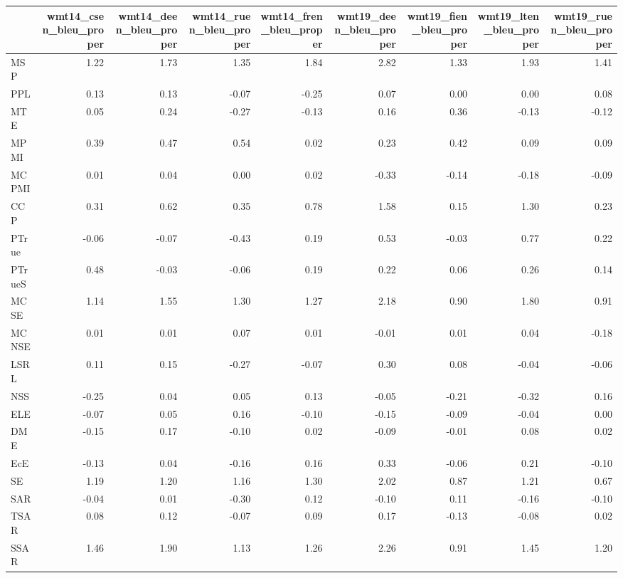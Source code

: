 \begin{tabular}{lrrrrrrrr}
\toprule
 & wmt14\_csen\_bleu\_proper & wmt14\_deen\_bleu\_proper & wmt14\_ruen\_bleu\_proper & wmt14\_fren\_bleu\_proper & wmt19\_deen\_bleu\_proper & wmt19\_fien\_bleu\_proper & wmt19\_lten\_bleu\_proper & wmt19\_ruen\_bleu\_proper \\
\midrule
MSP & 1.22 & 1.73 & 1.35 & 1.84 & 2.82 & 1.33 & 1.93 & 1.41 \\
PPL & 0.13 & 0.13 & -0.07 & -0.25 & 0.07 & 0.00 & 0.00 & 0.08 \\
MTE & 0.05 & 0.24 & -0.27 & -0.13 & 0.16 & 0.36 & -0.13 & -0.12 \\
MPMI & 0.39 & 0.47 & 0.54 & 0.02 & 0.23 & 0.42 & 0.09 & 0.09 \\
MCPMI & 0.01 & 0.04 & 0.00 & 0.02 & -0.33 & -0.14 & -0.18 & -0.09 \\
CCP & 0.31 & 0.62 & 0.35 & 0.78 & 1.58 & 0.15 & 1.30 & 0.23 \\
PTrue & -0.06 & -0.07 & -0.43 & 0.19 & 0.53 & -0.03 & 0.77 & 0.22 \\
PTrueS & 0.48 & -0.03 & -0.06 & 0.19 & 0.22 & 0.06 & 0.26 & 0.14 \\
MCSE & 1.14 & 1.55 & 1.30 & 1.27 & 2.18 & 0.90 & 1.80 & 0.91 \\
MCNSE & 0.01 & 0.01 & 0.07 & 0.01 & -0.01 & 0.01 & 0.04 & -0.18 \\
LSRL & 0.11 & 0.15 & -0.27 & -0.07 & 0.30 & 0.08 & -0.04 & -0.06 \\
NSS & -0.25 & 0.04 & 0.05 & 0.13 & -0.05 & -0.21 & -0.32 & 0.16 \\
ELE & -0.07 & 0.05 & 0.16 & -0.10 & -0.15 & -0.09 & -0.04 & 0.00 \\
DME & -0.15 & 0.17 & -0.10 & 0.02 & -0.09 & -0.01 & 0.08 & 0.02 \\
EcE & -0.13 & 0.04 & -0.16 & 0.16 & 0.33 & -0.06 & 0.21 & -0.10 \\
SE & 1.19 & 1.20 & 1.16 & 1.30 & 2.02 & 0.87 & 1.21 & 0.67 \\
SAR & -0.04 & 0.01 & -0.30 & 0.12 & -0.10 & 0.11 & -0.16 & -0.10 \\
TSAR & 0.08 & 0.12 & -0.07 & 0.09 & 0.17 & -0.13 & -0.08 & 0.02 \\
SSAR & 1.46 & 1.90 & 1.13 & 1.26 & 2.26 & 0.91 & 1.45 & 1.20 \\
\bottomrule
\end{tabular}
